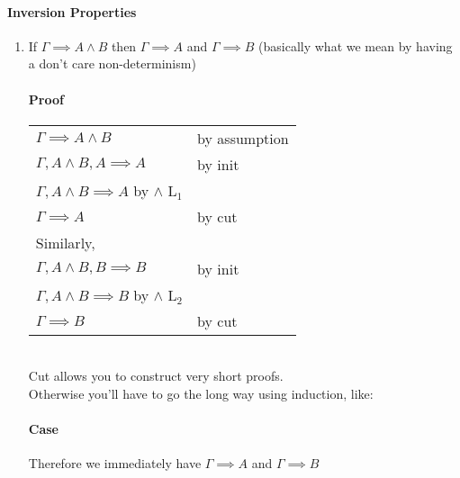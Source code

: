 \documentclass[12 pt]{article}
\begin{document}
       \paragraph{Inversion Properties}
       \begin{enumerate}
       \item If $\Gamma \implies A \land B$ then $\Gamma \implies A$
         and $\Gamma \implies B$ (basically what we mean by having a
         don't care non-determinism)
         \paragraph{Proof}
         
         \begin{tabular}[t]{l l}
           $\Gamma \implies A \land B$& by assumption
           \\ $\Gamma, A \land B, A \implies A$ & by init
           \\ $\Gamma, A \land B \implies A$ by $\land$ L$_1$
           \\ $\Gamma \implies A$ & by cut
           \\ Similarly,
           \\ $\Gamma, A \land B, B \implies B$ & by init
           \\ $\Gamma, A \land B \implies B$ by $\land$ L$_2$
           \\ $\Gamma \implies B$ & by cut
         \end{tabular}
         \\ Cut allows you to construct very short proofs.
         \\ Otherwise you'll have to go the long way using induction,
         like:
         \paragraph{Case} \DP
         Therefore we immediately have $\Gamma \implies A$ and $\Gamma
         \implies B$

\end{enumerate}
\end{document}

